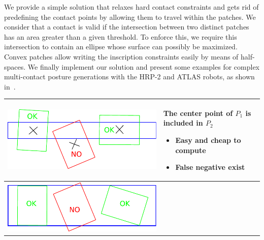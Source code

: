 We provide a simple solution that relaxes hard contact constraints and gets rid of predefining the contact points by allowing them to travel within the patches.
We consider that a contact is valid if the intersection between two distinct patches has an area greater than a given threshold.
To enforce this, we require this intersection to contain an ellipse whose surface can possibly be maximized.
Convex patches allow writing the inscription constraints easily by means of half-spaces.
We finally implement our solution and present some examples for complex multi-contact posture generations with the HRP-2 and ATLAS robots, as shown in~.

\begin{table}[h!]
  \centering
  \begin{tabular}{ c m{8cm} }
    \toprule
    \begin{minipage}{.4\textwidth}
      \includegraphics[width=0.9\linewidth]{contact1.pdf}
    \end{minipage}
    &
    The center point of $P_1$ is included
    in $P_2$
    \begin{itemize}
      \item Easy and cheap to compute
      \item False negative exist
    \end{itemize}
    \\ \midrule
    \begin{minipage}{.4\textwidth}
      \includegraphics[width=0.8\linewidth]{contact2.pdf}
    \end{minipage}

\end{tabular}
\end{table}
